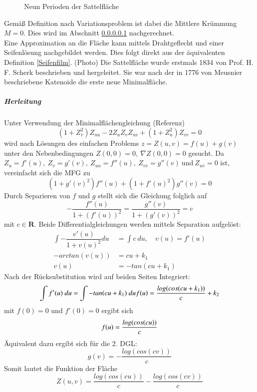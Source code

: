 \begin{refsection}
\begin{figure}[H]
  \caption{Neun Perioden der Sattelfläche} 
\end{figure}
Gemäß Definition nach Variationsproblem ist dabei die Mittlere Krümmung $M=0$. Dies wird im Abschnitt \ref{Scherk Herleitung}  nachgerechnet.\\ Eine Approximation an die Fläche kann mittels Drahtgeflecht und einer Seifenlösung nachgebildet werden. Dies folgt direkt aus der äquivalenten Definition \ref{Seifenfilm}. (Photo)
Die Sattelfläche wurde erstmals 1834 von Prof. H. F. Scherk beschrieben und hergeleitet. Sie war nach der in 1776 von Meusnier beschriebene Katenoide die erste neue Minimalfläche. 
\subparagraph{Herleitung}\label{Scherk Herleitung}
Unter Verwendung der Minimalflächengleichung (Referenz)
\begin{equation}\label{Minimalflaechengleichung}
(1+ Z_v^{2})Z_{uu} - 2 Z_u Z_v Z_{uv} + (1+ Z_u^{2}) Z_{vv}=0
\end{equation}
wird nach Lösungen des einfachen Problems $z=Z(u,v)=f(u)+g(v)$ unter den Nebenbedingungen $Z(0,0)=0,\ \nabla Z(0,0)=0$ gesucht. 
Da $ Z_u = f'(u),\ Z_v = g'(v),\ Z_{uu}=f''(u),\ Z_{vv} = g''(v) \ \text{und} \ Z_{uv}=0$ ist, vereinfacht sich die MFG zu 
\begin{equation}\label{MFG Scherk}
(1+g'(v)^2)f''(u)+(1+f'(u)^2)g''(v)=0
\end{equation}
Durch Separieren von $f$ und $g$ stellt sich die Gleichung folglich auf
\begin{equation}\label{MFG Scherk2}
-\dfrac{f''(u)}{1+(f'(u))^2}=\dfrac{g''(v)}{1+(g'(v))^2}=c
\end{equation}
mit $c \in \mathbf{R}$.
Beide Differentialgleichungen werden mittels Separation aufgelöst:
\begin{equation}\label{ScherkDGL1}
\begin{split}
\int -\dfrac{v'(u)}{1+v(u)^2} du &= \int c \ du , \quad v(u)=f'(u) \\
-arctan(v(u)) &= cu+k_1 \\
v(u) &= -tan(cu+k_1)
\end{split}
\end{equation}
Nach der Rücksubstitution wird auf beiden Seiten Integriert:
\begin{equation}\label{SchreckDGL2}
\int f'(u)\ du = \int -tan(cu+k_1)\ du\\
f(u) = \dfrac{log(cos(cu+k_1))}{c}+k_2\\
\end{equation}
mit $f(0)=0$ und $f'(0)=0$ ergibt sich
\begin{equation}
f(u) = \dfrac{log(cos(cu))}{c}\\
\end{equation}
Äquivalent dazu ergibt sich für die 2. DGL:
\begin{equation}
g(v) = - \dfrac{log(cos(cv))}{c}
\end{equation}
Somit lautet die Funktion der Fläche
\begin{equation}
Z(u,v)=\dfrac{log(cos(cu))}{c}-\dfrac{log(cos(cv))}{c}
\end{equation}


\end{refsection}
